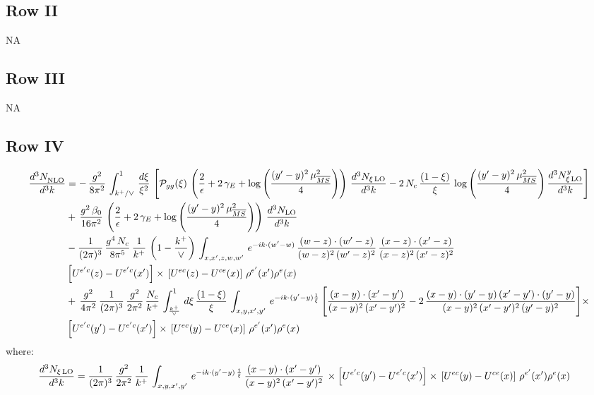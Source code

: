 \documentclass[9pt]{article}
\numberwithin{equation}{section}
\begin{document}
\subsection{Row II}
\textsc{NA}
\subsection{Row III}
\textsc{NA}
\subsection{Row IV}
\begin{align}
    \frac{d^{3}N_{\rm NLO}^{\rm}}{d^{3}k}  & =  
    -\,\frac{g^{2}}{8\pi^{2}}\,\int_{k^{+}/\vee}^{1}\, \frac{d\xi}{\xi^{2}}\,\left[\mathcal{P}_{gg}(\xi)\,\left(\frac{2}{\epsilon}+2\,\gamma_{E}+\log{\left(\frac{(y'-y)^{2}\,\mu^{2}_{\overline{MS}}}{4}\right)}\right)\,\frac{d^{3}N_{\xi\,\rm LO}}{d^{3}k}-2\,N_{c}\,\frac{(1-\xi)}{\xi}\,\log{\left(\frac{(y'-y)^{2}\,\mu^{2}_{\overline{MS}}}{4}\right)}\,\frac{d^{3}N^{y}_{\xi\,\rm LO}}{d^{3}k} \right]\notag \\ & +\,\frac{g^{2}\,\beta_{0}}{16\pi^{2}}\,\left(\frac{2}{\epsilon}+2\,\gamma_{E}+\log{\left(\frac{(y'-y)^{2}\,\mu^{2}_{\overline{MS}}}{4}\right)}\right)\,\frac{d^{3}N_{\rm LO}}{d^{3}k}\notag \\ &
    -\frac{1}{(2\pi)^{3}}\,\frac{g^{4}\,N_{c}}{8\pi^{5}}\,\frac{1}{k^{+}}\,\left(1-\frac{k^{+}}{\vee}\right)\,\int_{x,x',z,w,w'}\,e^{-ik\cdot (w'-w)}\,\frac{(w-z)\cdot(w'-z)}{(w-z)^{2}\,(w'-z)^{2}}\,\frac{(x-z)\cdot(x'-z)}{(x-z)^{2}\,(x'-z)^{2}}\notag \\
& \left[U^{e'c}(z) - U^{e'c}(x')\right] \times\, \left[U^{ec}(z) - U^{ce}(x)\right]\, \rho^{e'}(x') \rho^{e}(x) \notag \\
&  +\,\frac{g^{2}}{4\pi^{2}}\, \frac{1}{(2\pi)^{3}}\,\frac{g^{2}}{2\pi^{2}}\, \frac{N_{c}}{k^{+}}\,\int_{\frac{k^{+}}{\vee}}^{1}\,d\xi\, \frac{(1-\xi)}{\xi}\, \int_{x,y,x',y'}\,e^{-ik\cdot (y'-y)\frac{1}{\xi}}\,\Bigg[\frac{(x-y)\cdot (x'-y')}{(x-y)^{2}\, (x'-y')^{2}} -2\,\frac{(x-y)\cdot (y'-y)\, (x'-y')\cdot (y'-y)}{(x-y)^{2}\,(x'-y')^{2}\,(y'-y)^{2}}\Bigg]\times\notag \\ &  \left[U^{e'c}(y') - U^{e'c}(x')\right] \times\, \left[U^{ec}(y) - U^{ce}(x)\right]\, \rho^{e'}(x') \rho^{e}(x)
\end{align}
where: 
\begin{align}
    \frac{d^{3}N_{\xi\,\rm LO}}{d^{3}k} & = \frac{1}{(2\pi)^{3}}\, \frac{g^{2}}{2\pi^{2}}\, \frac{1}{k^{+}}\,\int_{x,y,x',y'}\, e^{-ik\cdot (y'-y)\,\frac{1}{\xi}}\, \frac{(x-y)\cdot (x'-y')}{(x-y)^{2}\,(x'-y')^{2}}\,\times \left[U^{e'c}(y') - U^{e'c}(x')\right] \times\, \left[U^{ec}(y) - U^{ce}(x)\right]\, \rho^{e'}(x') \rho^{e}(x) 
\end{align}
\end{document}
